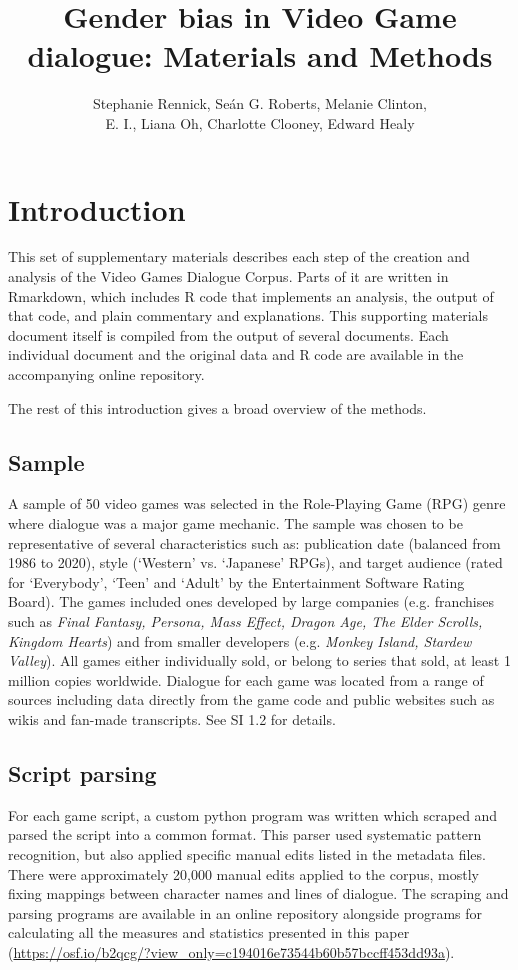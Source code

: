 \documentclass[12pt,a4paper]{article}
\author{Stephanie Rennick, Se\'{a}n G. Roberts, Melanie Clinton,\\E. I., Liana Oh, Charlotte Clooney, Edward Healy}
\title{Gender bias in Video Game dialogue: Materials and Methods}
\date{}
\begin{document}
\maketitle


\section{Introduction}

This set of supplementary materials describes each step of the creation and analysis of the Video Games Dialogue Corpus. Parts of it are written in Rmarkdown, which includes R code that implements an analysis, the output of that code, and plain commentary and explanations. This supporting materials document itself is compiled from the output of several documents. Each individual document and the original data and R code are available in the accompanying online repository.

The rest of this introduction gives a broad overview of the methods.

\subsection*{Sample}

A sample of 50 video games was selected in the Role-Playing Game (RPG) genre where dialogue was a major game mechanic. The sample was chosen to be representative of several characteristics such as: publication date (balanced from 1986 to 2020), style (`Western' vs. `Japanese' RPGs), and target audience (rated for `Everybody', `Teen' and `Adult' by the Entertainment Software Rating Board). The games included ones developed by large companies (e.g. franchises such as \emph{Final Fantasy, Persona, Mass Effect, Dragon Age, The Elder Scrolls, Kingdom Hearts}) and from smaller developers (e.g. \emph{Monkey Island, Stardew Valley}). All games either individually sold, or belong to series that sold, at least 1 million copies worldwide. Dialogue for each game was located from a range of sources including data directly from the game code and public websites such as wikis and fan-made transcripts. See SI 1.2 for details.

\subsection*{Script parsing}
For each game script, a custom python program was written which scraped and parsed the script into a common format. This parser used systematic pattern recognition, but also applied specific manual edits listed in the metadata files. There were approximately 20,000 manual edits applied to the corpus, mostly fixing mappings between character names and lines of dialogue. The scraping and parsing programs are available in an online repository alongside programs for calculating all the measures and statistics presented in this paper (\url{https://osf.io/b2qcg/?view_only=c194016e73544b60b57bccff453dd93a}). %
\end{document}
